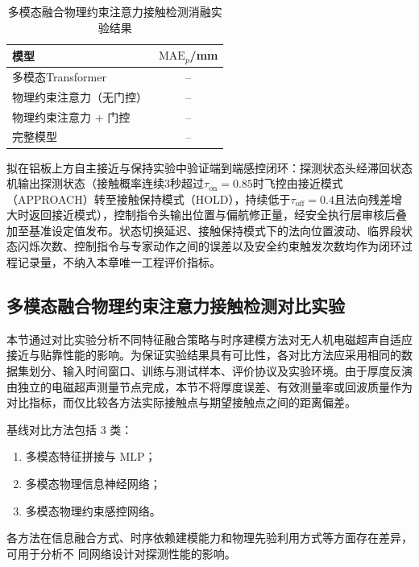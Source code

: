 \begin{table}[htbp]
\centering
\caption{多模态融合物理约束注意力接触检测消融实验结果}
\label{tab:mm_ablation_results}
\begin{tabular}{lc}
\toprule
\textbf{模型} & \textbf{$\mathrm{MAE}_{p}$/mm} \\
\midrule
多模态Transformer & -- \\
物理约束注意力（无门控） & -- \\
物理约束注意力 + 门控 & -- \\
完整模型 & -- \\
\bottomrule
\end{tabular}
\end{table}

拟在铝板上方自主接近与保持实验中验证端到端感控闭环：探测状态头经滞回状态机输出探测状态（接触概率连续3秒超过$\tau_{\text{on}} = 0.85$时飞控由接近模式（APPROACH）转至接触保持模式（HOLD），持续低于$\tau_{\text{off}} = 0.4$且法向残差增大时返回接近模式），控制指令头输出位置与偏航修正量，经安全执行层审核后叠加至基准设定值发布。状态切换延迟、接触保持模式下的法向位置波动、临界段状态闪烁次数、控制指令与专家动作之间的误差以及安全约束触发次数均作为闭环过程记录量，不纳入本章唯一工程评价指标。

\subsection{多模态融合物理约束注意力接触检测对比实验}

本节通过对比实验分析不同特征融合策略与时序建模方法对无人机电磁超声自适应接近与贴靠性能的影响。为保证实验结果具有可比性，各对比方法应采用相同的数据集划分、输入时间窗口、训练与测试样本、评价协议及实验环境。由于厚度反演由独立的电磁超声测量节点完成，本节不将厚度误差、有效测量率或回波质量作为对比指标，而仅比较各方法实际接触点与期望接触点之间的距离偏差。

基线对比方法包括 3 类：

\begin{enumerate}[
    label=(\arabic*),
    labelindent=\parindent,
    itemindent=0pt,
    labelwidth=2em,
    labelsep=0.5em,
    leftmargin=*
]
\item 多模态特征拼接与 MLP；
\item 多模态物理信息神经网络；
\item 多模态物理约束感控网络。
\end{enumerate}

各方法在信息融合方式、时序依赖建模能力和物理先验利用方式等方面存在差异，可用于分析不
同网络设计对探测性能的影响。

